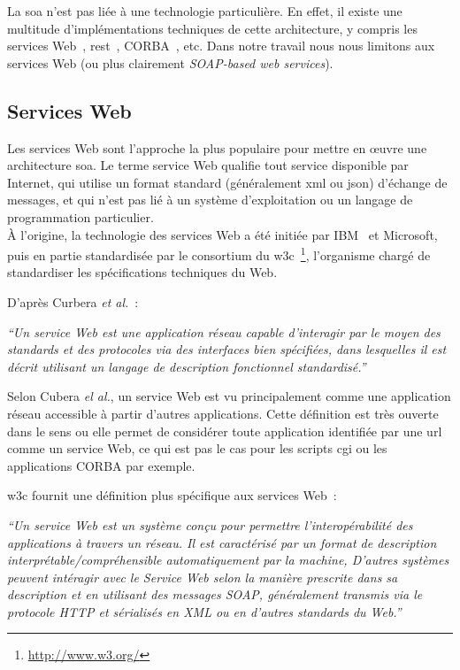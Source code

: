   La \acrshort{soa} n'est pas liée à une technologie particulière. En
  effet, il existe une multitude d'implémentations techniques de cette
  architecture, y compris les services Web~\cite{WSA},
  \acrshort{rest}~\cite{fielding2000architectural},
  \textsc{CORBA}~\cite{vinoski1997corba}, etc. Dans notre travail nous
  nous limitons aux services Web (ou plus clairement
  \textit{SOAP-based web services}).

  \subsection{Services Web}
  \label{sec:ws-def}
  Les services Web sont l'approche la plus populaire pour mettre en
  œuvre une architecture \acrshort{soa}. Le terme service Web qualifie
  tout service disponible par Internet, qui utilise un format standard
  (généralement \acrshort{xml} ou \acrshort{json}) d'échange de
  messages, et qui n'est pas lié à un système d'exploitation ou un
  langage de programmation particulier.\\

  À l'origine, la technologie des services Web a été initiée par
  IBM~\cite{kreger2001web} et Microsoft, puis en partie standardisée
  par le consortium du
  \acrshort{w3c}~\footnote{\url{http://www.w3.org/}}, l'organisme
  chargé de standardiser les spécifications techniques du Web.\medskip

  D'après Curbera \emph{et al.}~\cite{curbera2001web}:\bigskip

  \textit{``Un service Web est une application réseau capable
    d'interagir par le moyen des standards et des protocoles via des
    interfaces bien spécifiées, dans lesquelles il est décrit
    utilisant un langage de description fonctionnel
    standardisé.''}\bigskip

  Selon Cubera \emph{el al.}, un service Web est vu principalement
  comme une application réseau accessible à partir d'autres
  applications. Cette définition est très ouverte dans le sens ou elle
  permet de considérer toute application identifiée par une
  \acrshort{url} comme un service Web, ce qui est pas le cas pour les
  scripts \acrshort{cgi} ou les applications \textsc{CORBA} par
  exemple.\medskip

  \acrshort{w3c} fournit une définition plus spécifique aux services
  Web~\cite{WSA}:\bigskip

  \textit{``Un service Web est un système conçu pour permettre
    l'interopérabilité des applications à travers un réseau.  Il est
    caractérisé par un format de description
    interprétable/compréhensible automatiquement par la machine,
    D'autres systèmes peuvent intéragir avec le Service Web selon la
    manière prescrite dans sa description et en utilisant des messages
    SOAP, généralement transmis via le protocole HTTP et sérialisés en
    XML ou en d'autres standards du Web.''} \bigskip


